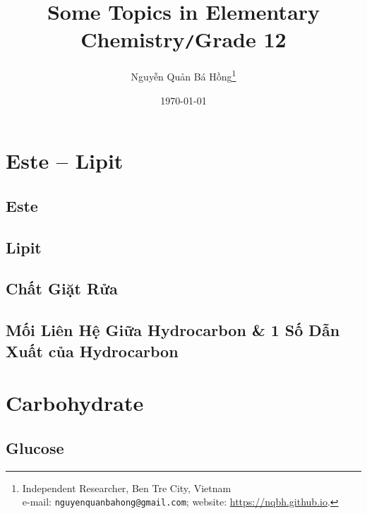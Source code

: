 \documentclass{article}
\title{Some Topics in Elementary Chemistry\texttt{/}Grade 12}
\author{Nguyễn Quản Bá Hồng\footnote{Independent Researcher, Ben Tre City, Vietnam\\e-mail: \texttt{nguyenquanbahong@gmail.com}; website: \url{https://nqbh.github.io}.}}
\date{\today}
\numberwithin{equation}{section}
\begin{document}
\maketitle
\begin{abstract}
	
\end{abstract}
\setcounter{secnumdepth}{4}
\setcounter{tocdepth}{3}
\tableofcontents
\newpage


\section{Este -- Lipit}

\subsection{Este}


\subsection{Lipit}


\subsection{Chất Giặt Rửa}


\subsection{Mối Liên Hệ Giữa Hydrocarbon \& 1 Số Dẫn Xuất của Hydrocarbon}


\section{Carbohydrate}

\subsection{Glucose}
\end{document}

